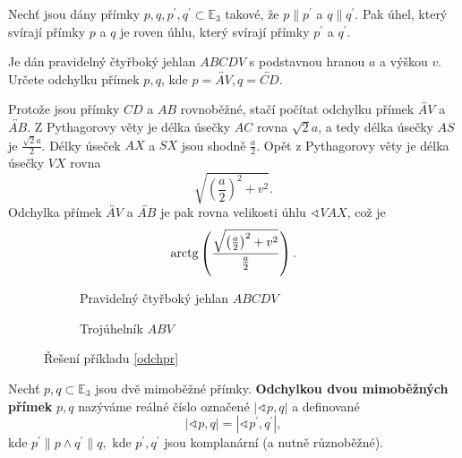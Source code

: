 \begin{veta}
    Nechť jsou dány přímky $p, q, p^\prime, q^\prime \subset \mathbb E_3$ takové, že
    $p\parallel p^\prime$ a $q\parallel q^\prime.$
    Pak úhel, který svírají přímky $p$ a $q$ je roven úhlu, který svírají přímky $p^\prime$ a $q^\prime$.
\end{veta}

\begin{priklad}\label{odchpr}
Je dán pravidelný čtyřboký jehlan $ABCDV$ s podstavnou hranou $a$ a výškou $v$.
Určete odchylku přímek $p,q$, kde $p=\overleftrightarrow{AV}, q=\overleftrightarrow{CD}.$
\end{priklad}

\begin{reseni}
Protože jsou přímky $CD$ a $AB$ rovnoběžné, stačí počítat odchylku přímek $\overleftrightarrow{AV}$
a~$\overleftrightarrow{AB}$.
Z Pythagorovy věty je délka úsečky $AC$ rovna $\sqrt{2}a$, a tedy délka úsečky $AS$ je $\frac{\sqrt{2}a }{2}$.
Délky úseček $AX$ a $SX$ jsou shodně $\frac{a }{2}$. Opět z Pythagorovy věty je délka úsečky $VX$
rovna
$$\sqrt{\left(\frac{a }{2}\right)^2 + v^2}.$$
Odchylka přímek $\overleftrightarrow{AV}$ a
$\overleftrightarrow{AB}$ je pak rovna velikosti úhlu $\sphericalangle VAX$, což je
$$
    \operatorname{arctg} \left( \frac{\sqrt{\left(\frac{a }{2}\right)^2 + v^2}}{\frac{a }{2}} \right ) .
$$
\begin{figure}[h]
	\begin{subfigure}{.5\textwidth}
	\centering
	\caption{Pravidelný čtyřboký jehlan $ABCDV$}
	\end{subfigure}
	\begin{subfigure}{.5\textwidth}
	\centering
	\caption{Trojúhelník $ABV$}
	\end{subfigure}


	\caption{Řešení příkladu \ref{odchpr}}
\end{figure}
\end{reseni}

\begin{definition}
    Nechť $p,q \subset \mathbb E_3$ jsou dvě mimoběžné přímky. \textbf{Odchylkou
    dvou mimoběžných přímek} $p,q$ nazýváme reálné číslo označené $|\sphericalangle
    p,q|$ a definované
    $$|\sphericalangle p,q| = |\sphericalangle p^\prime, q^\prime|,$$
    kde $p^\prime \parallel p \land q^\prime \parallel q,$ kde $p^\prime, q^\prime$
    jsou komplanární (a nutně různoběžné).
\end{definition}

